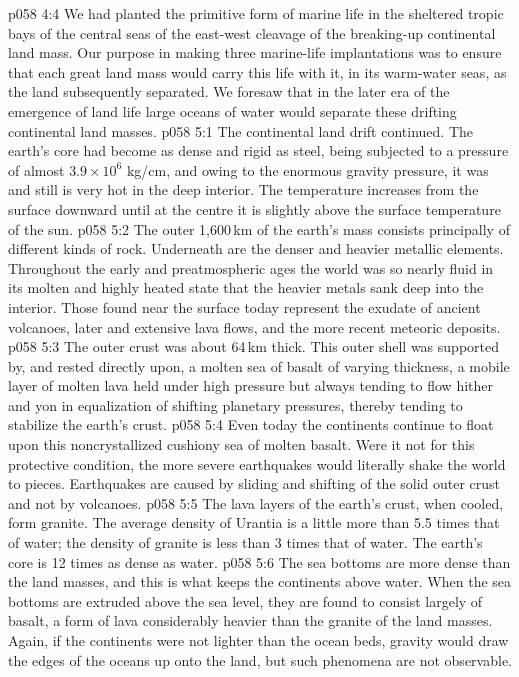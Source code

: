 \vs p058 4:4 We had planted the primitive form of marine life in the sheltered tropic bays of the central seas of the east\hyp{}west cleavage of the breaking\hyp{}up continental land mass. Our purpose in making three marine\hyp{}life implantations was to ensure that each great land mass would carry this life with it, in its warm\hyp{}water seas, as the land subsequently separated. We foresaw that in the later era of the emergence of land life large oceans of water would separate these drifting continental land masses.
\vs p058 5:1 The continental land drift continued. The earth’s core had become as dense and rigid as steel, being subjected to a pressure of almost $3.9 \times 10^{6}$ kg/cm, and owing to the enormous gravity pressure, it was and still is very hot in the deep interior. The temperature increases from the surface downward until at the centre it is slightly above the surface temperature of the sun.
\vs p058 5:2 The outer 1,600\,km of the earth’s mass consists principally of different kinds of rock. Underneath are the denser and heavier metallic elements. Throughout the early and preatmospheric ages the world was so nearly fluid in its molten and highly heated state that the heavier metals sank deep into the interior. Those found near the surface today represent the exudate of ancient volcanoes, later and extensive lava flows, and the more recent meteoric deposits.
\vs p058 5:3 The outer crust was about 64\,km thick. This outer shell was supported by, and rested directly upon, a molten sea of basalt of varying thickness, a mobile layer of molten lava held under high pressure but always tending to flow hither and yon in equalization of shifting planetary pressures, thereby tending to stabilize the earth’s crust.
\vs p058 5:4 Even today the continents continue to float upon this noncrystallized cushiony sea of molten basalt. Were it not for this protective condition, the more severe earthquakes would literally shake the world to pieces. Earthquakes are caused by sliding and shifting of the solid outer crust and not by volcanoes.
\vs p058 5:5 \pc The lava layers of the earth’s crust, when cooled, form granite. The average density of Urantia is a little more than 5.5 times that of water; the density of granite is less than 3 times that of water. The earth’s core is 12 times as dense as water.
\vs p058 5:6 The sea bottoms are more dense than the land masses, and this is what keeps the continents above water. When the sea bottoms are extruded above the sea level, they are found to consist largely of basalt, a form of lava considerably heavier than the granite of the land masses. Again, if the continents were not lighter than the ocean beds, gravity would draw the edges of the oceans up onto the land, but such phenomena are not observable.
